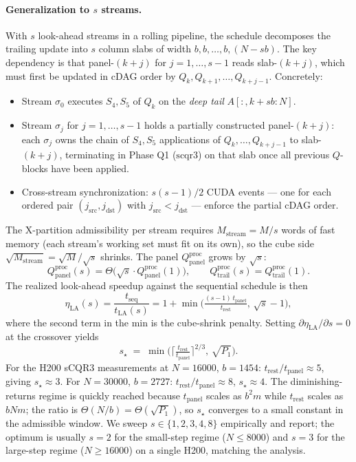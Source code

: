 \documentclass[11pt]{article}
\begin{document}
\paragraph{Generalization to $s$ streams.}
With $s$ look-ahead streams in a rolling pipeline, the schedule
decomposes the trailing update into $s$ column slabs of width
$b, b, \dots, b, (N{-}sb)$. The key dependency is that panel-$(k{+}j)$
for $j = 1, \dots, s{-}1$ reads slab-$(k{+}j)$, which must first be
updated in cDAG order by $Q_k, Q_{k+1}, \dots, Q_{k+j-1}$. Concretely:
\begin{itemize}[leftmargin=2em]
  \item Stream $\sigma_0$ executes $S_4, S_5$ of $Q_k$ on the
        \emph{deep tail} $A[:, k{+}sb : N]$.
  \item Stream $\sigma_j$ for $j = 1, \dots, s{-}1$ holds a partially
        constructed panel-$(k{+}j)$: each $\sigma_j$ owns the chain of
        $S_4, S_5$ applications of $Q_k, \dots, Q_{k+j-1}$ to
        slab-$(k{+}j)$, terminating in Phase Q1 ($\mathrm{scqr3}$) on
        that slab once all previous $Q$-blocks have been applied.
  \item Cross-stream synchronization: $s(s{-}1)/2$ CUDA events --- one
        for each ordered pair $(j_{\text{src}}, j_{\text{dst}})$ with
        $j_{\text{src}} < j_{\text{dst}}$ --- enforce the partial
        cDAG order.
\end{itemize}
The X-partition admissibility per stream requires
$M_{\text{stream}} = M/s$ words of fast memory (each stream's working
set must fit on its own), so the cube side
$\sqrt{M_{\text{stream}}} = \sqrt{M}/\sqrt{s}$ shrinks. The panel
$Q^{\text{proc}}_{\text{panel}}$ grows by $\sqrt{s}$:
\[
  Q^{\text{proc}}_{\text{panel}}(s)
    = \Theta\!\big(\sqrt{s} \cdot Q^{\text{proc}}_{\text{panel}}(1)\big),
  \qquad
  Q^{\text{proc}}_{\text{trail}}(s) = Q^{\text{proc}}_{\text{trail}}(1).
\]
The realized look-ahead speedup against the sequential schedule is then
\[
  \eta_{\text{LA}}(s)
   = \frac{t_{\text{seq}}}{t_{\text{LA}}(s)}
   = 1 + \min\!\Big(\tfrac{(s-1)\, t_{\text{panel}}}{t_{\text{rest}}},\,
                     \sqrt{s} - 1\Big),
\]
where the second term in the min is the cube-shrink penalty. Setting
$\partial \eta_{\text{LA}}/\partial s = 0$ at the crossover yields
\[
  \boxed{\;s_\star \;=\; \min\!\Big(
    \Big\lceil\tfrac{t_{\text{rest}}}{t_{\text{panel}}}\Big\rceil^{2/3},\,
    \sqrt{P_1}\Big).\;}
\]
For the H200 sCQR3 measurements at $N = 16000$, $b = 1454$:
$t_{\text{rest}}/t_{\text{panel}} \approx 5$, giving $s_\star \approx
3$. For $N = 30000$, $b = 2727$: $t_{\text{rest}}/t_{\text{panel}}
\approx 8$, $s_\star \approx 4$. The diminishing-returns regime is
quickly reached because $t_{\text{panel}}$ scales as $b^2 m$ while
$t_{\text{rest}}$ scales as $b N m$; the ratio is
$\Theta(N/b) = \Theta(\sqrt{P_1})$, so $s_\star$ converges to a small
constant in the admissible window. We sweep $s \in \{1, 2, 3, 4, 8\}$
empirically and report; the optimum is usually $s = 2$ for the
small-step regime ($N \le 8000$) and $s = 3$ for the large-step regime
($N \ge 16000$) on a single H200, matching the analysis.
\end{document}
